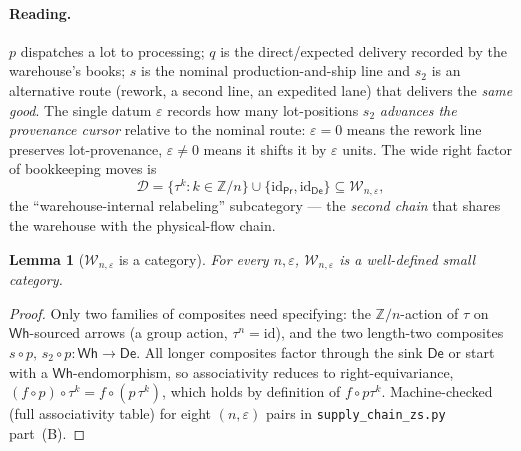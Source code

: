 \documentclass[11pt]{article}
\newtheorem{lemma}[theorem]{Lemma}
\theoremstyle{definition}
\newcommand{\id}{\mathrm{id}}
\newcommand{\D}{\mathcal{D}}
\newcommand{\W}{\mathcal{W}}
\newcommand{\Wh}{\mathsf{Wh}}
\newcommand{\Prc}{\mathsf{Pr}}
\newcommand{\De}{\mathsf{De}}
\newcommand{\Zn}{\mathbb{Z}/n}
\begin{document}
\paragraph{Reading.} $p$ dispatches a lot to processing; $q$ is the direct/expected
delivery recorded by the warehouse's books; $s$ is the nominal production-and-ship
line and $s_2$ is an alternative route (rework, a second line, an expedited lane) that
delivers the \emph{same good}. The single datum $\varepsilon$ records how many
lot-positions $s_2$ \emph{advances the provenance cursor} relative to the nominal
route: $\varepsilon=0$ means the rework line preserves lot-provenance, $\varepsilon\ne0$
means it shifts it by $\varepsilon$ units. The wide right factor of bookkeeping moves
is
\[
   \D=\{\tau^k:k\in\Zn\}\cup\{\id_\Prc,\id_\De\}\subseteq\W_{n,\varepsilon},
\]
the ``warehouse-internal relabeling'' subcategory --- the \emph{second chain} that
shares the warehouse with the physical-flow chain.

\begin{lemma}[$\W_{n,\varepsilon}$ is a category]\label{lem:cat}
For every $n,\varepsilon$, $\W_{n,\varepsilon}$ is a well-defined small category.
\end{lemma}
\begin{proof}
Only two families of composites need specifying: the $\Zn$-action of $\tau$ on
$\Wh$-sourced arrows (a group action, $\tau^n=\id$), and the two length-two composites
$s\circ p,\,s_2\circ p:\Wh\to\De$. All longer composites factor through the sink $\De$
or start with a $\Wh$-endomorphism, so associativity reduces to right-equivariance,
$(f\circ p)\circ\tau^k=f\circ(p\,\tau^k)$, which holds by definition of $f\circ
p\tau^k$. Machine-checked (full associativity table) for eight $(n,\varepsilon)$ pairs
in \texttt{supply\_chain\_zs.py} part~(B).
\end{proof}
\end{document}
